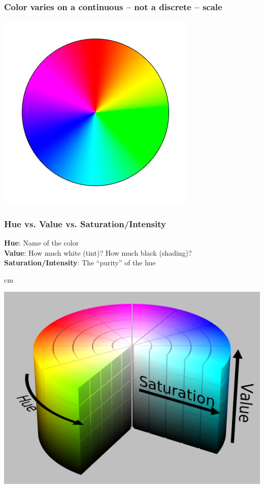 \documentclass{beamer} %
\begin{document}
\begin{frame}\frametitle{Color varies on a continuous -- not a discrete -- scale}
	\centering
	
	\includegraphics[width=0.8\linewidth]{colorwheel4}
	
\end{frame}



\begin{frame}\frametitle{Hue vs. Value vs. Saturation/Intensity}
	\centering
	
	\textbf{Hue}:  Name of the color\\
	\textbf{Value}:  How much white (tint)?  How much black (shading)?\\
	\textbf{Saturation/Intensity}:  The ``purity'' of the hue
	
	 cm
	
	\includegraphics[width=0.77\linewidth]{colorwheel5}
	
\end{frame}
\end{document}
